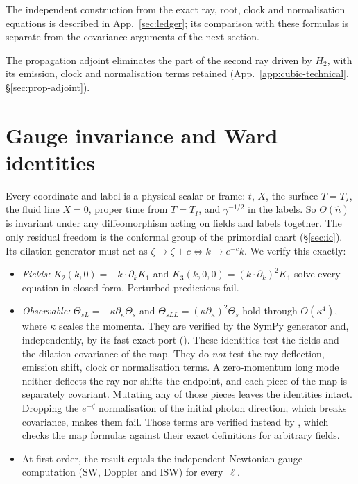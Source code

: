 \documentclass[11pt]{article}
\theoremstyle{definition}
\theoremstyle{remark}
\newcommand{\nh}{\hat n}
\begin{document}
The independent construction from the exact ray, root, clock and normalisation equations
is described in App.~\ref{sec:ledger}; its comparison with these formulas is separate from
the covariance arguments of the next section.

The propagation adjoint eliminates the part of the second ray driven by $H_2$,
with its emission, clock and normalisation terms retained
(App.~\ref{app:cubic-technical}, \S\ref{sec:prop-adjoint}).

\section{Gauge invariance and Ward identities}\label{sec:gauge}

Every coordinate and label is a physical scalar or frame: $t$, $X$, the surface $T=T_\star$,
the fluid line $X=0$, proper time from $T=T_I$, and $\gamma^{-1/2}$ in the labels. So $\Theta(\nh)$
is invariant under any diffeomorphism acting on fields and labels together. The only residual
freedom is the conformal group of the primordial chart (\S\ref{sec:ic}). Its dilation generator
must act as $\zeta\to\zeta+c\Leftrightarrow k\to e^{-c}k$. We verify this exactly:

\begin{itemize}
\item \emph{Fields:} $K_2(k,0)=-k\cdot\partial_kK_1$ and $K_3(k,0,0)=(k\cdot\partial_k)^2K_1$
  solve every equation in closed form. Perturbed predictions fail.
\item \emph{Observable:} $\Theta_{sL}=-\kappa\partial_\kappa\Theta_s$ and
  $\Theta_{sLL}=(\kappa\partial_\kappa)^2\Theta_s$ hold through $O(\kappa^4)$, where $\kappa$ scales
  the momenta. They are verified by the SymPy generator and, independently, by its fast exact
  port (). These identities test the fields and the dilation
  covariance of the map. They do \emph{not} test the ray deflection, emission shift, clock or
  normalisation terms. A zero-momentum long mode neither deflects the ray nor shifts the
  endpoint, and each piece of the map is separately covariant. Mutating any of those pieces
  leaves the identities intact. Dropping the $e^{-\zeta}$ normalisation of the initial photon
  direction, which breaks covariance, makes them fail. Those terms are verified instead by
  , which checks the map formulas against their
  exact definitions for arbitrary fields.
\item At first order, the result equals the independent Newtonian-gauge computation
  (SW, Doppler and ISW) for every~$\ell$.
\end{itemize}
\end{document}
